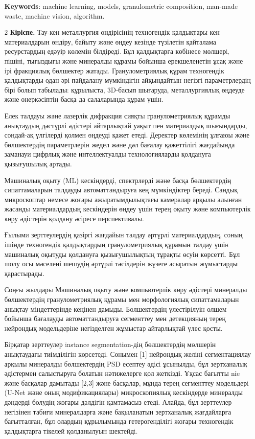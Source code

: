 {\bfseries Keywords}: machine learning, models, granulometric composition,
man-made waste, machine vision, algorithm.

\begin{multicols}{2}
{\bfseries Кіріспе.} Тау-кен металлургия өндірісінің техногендік қалдықтары
кен материалдарын өндіру, байыту және өңдеу кезінде түзілетін қайталама
ресурстардың едәуір көлемін білдіреді. Бұл қалдықтарға көбінесе мөлшері,
пішіні, тығыздығы және минералды құрамы бойынша ерекшеленетін ұсақ және
ірі фракциялық бөлшектер жатады. Гранулометриялық құрам техногендік
қалдықтарды одан әрі пайдалану мүмкіндігін айқындайтын негізгі
параметрлердің бірі болып табылады: құрылыста, 3D-басып шығаруда,
металлургиялық өңдеуде және өнеркәсіптің басқа да салаларында құрам
үшін.

Елек талдауы және лазерлік дифракция сияқты гранулометриялық құрамды
анықтаудың дәстүрлі әдістері айтарлықтай уақыт пен материалдық
шығындарды, сондай-ақ үлгілерді қолмен өңдеуді қажет етеді. Деректер
көлемінің ұлғаюы және бөлшектердің параметрлерін жедел және дәл бағалау
қажеттілігі жағдайында заманауи цифрлық және интеллектуалды
технологияларды қолдануға қызығушылық артады.

Машиналық оқыту (ML) кескіндерді, спектрлерді және басқа бөлшектердің
сипаттамаларын талдауды автоматтандыруға кең мүмкіндіктер береді. Сандық
микроскоптар немесе жоғары ажыратымдылықтағы камералар арқылы алынған
жасанды материалдардың кескіндерін өңдеу үшін терең оқыту және
компьютерлік көру әдістерін қолдану әсіресе перспективалы.

Ғылыми зерттеулердің қазіргі жағдайын талдау әртүрлі материалдардың,
соның ішінде техногендік қалдықтардың гранулометриялық құрамын талдау
үшін машиналық оқытуды қолдануға қызығушылықтың тұрақты өсуін көрсетті.
Бұл шолу осы мәселені шешудің әртүрлі тәсілдерін жүзеге асыратын
жұмыстарды қарастырады.

Соңғы жылдары Машиналық оқыту және компьютерлік көру әдістері минералды
бөлшектердің гранулометриялық құрамы мен морфологиялық сипаттамаларын
анықтау міндеттерінде кеңінен дамыды. Бөлшектердің үлестірілуін өлшем
бойынша бағалауды автоматтандыруға сегменттеу мен детекцияның терең
нейрондық модельдеріне негізделген жұмыстар айтарлықтай үлес қосты.

Бірқатар зерттеулер instance segmentation-дің бөлшектердің мөлшерін
анықтаудағы тиімділігін көрсетеді. Сонымен {[}1{]} нейрондық желіні
сегментациялау арқылы минералды бөлшектердің PSD есептеу әдісі ұсынылды,
бұл зертханалық әдістермен салыстыруға болатын нәтижелерге қол жеткізді.
Ұқсас бағытты nie және басқалар дамытады {[}2,3{]} және басқалар, мұнда
терең сегменттеу модельдері (U-Net және оның модификациялары)
микроскопиялық кескіндерде минералды дәндерді бөлудің жоғары дәлдігін
қамтамасыз етеді. Алайда, бұл зерттеулер негізінен табиғи минералдарға
және бақыланатын зертханалық жағдайларға бағытталған, бұл олардың
құрылымында гетерогенділігі жоғары техногендік қалдықтарға тікелей
қолданылуын шектейді.


\end{multicols}
